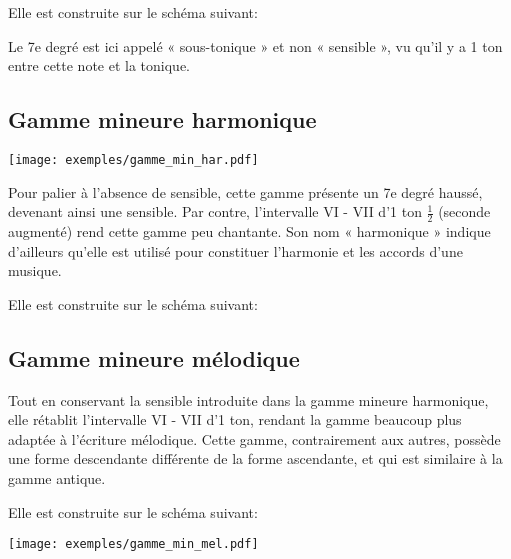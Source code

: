 \documentclass[11pt]{scrreprt}
\begin{document}
Elle est construite sur le schéma suivant: 
\begin{center}
\end{center}
Le 7e degré est ici appelé « sous-tonique » et non « sensible », vu qu'il y a 1 ton entre cette note et la tonique.

\subsection{Gamme mineure harmonique}
\begin{center}
   \texttt{[image: exemples/gamme\_min\_har.pdf]}
\end{center}

Pour palier à l'absence de sensible, cette gamme présente un 7e degré haussé, devenant ainsi une sensible. Par contre, l'intervalle VI - VII d'1 ton $\frac1 2$ (seconde augmenté) rend cette gamme peu chantante. Son nom « harmonique » indique d'ailleurs qu'elle est utilisé pour constituer l'harmonie et les accords d'une musique.

Elle est construite sur le schéma suivant: 
\begin{center}
\end{center}

\subsection{Gamme mineure mélodique}
Tout en conservant la sensible introduite dans la gamme mineure harmonique, elle rétablit l'intervalle VI - VII d'1 ton, rendant la gamme beaucoup plus adaptée à l'écriture mélodique. Cette gamme, contrairement aux autres, possède une forme descendante différente de la forme ascendante, et qui est similaire à la gamme antique.

Elle est construite sur le schéma suivant: 
\begin{center}
\end{center}
\begin{center}
   \texttt{[image: exemples/gamme\_min\_mel.pdf]}
\end{center}
\end{document}
